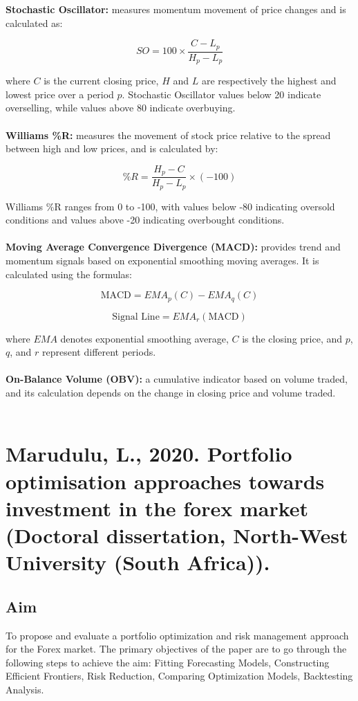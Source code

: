 \documentclass{article}
\begin{document}
    \textbf{Stochastic Oscillator:} measures momentum movement of price changes and is calculated as:
    
    \[
    SO = 100 \times \frac{C - L_p}{H_p - L_p}
    \]
    
    where \(C\) is the current closing price, \(H\) and \(L\) are respectively the highest and lowest price over a period \(p\). Stochastic Oscillator values below 20 indicate overselling, while values above 80 indicate overbuying.\\\\
    
    \textbf{Williams \%R:}
    measures the movement of stock price relative to the spread between high and low prices, and is calculated by:
    
    \[
    \%R = \frac{H_p - C}{H_p - L_p} \times (-100)
    \]
    
    Williams \%R ranges from 0 to -100, with values below -80 indicating oversold conditions and values above -20 indicating overbought conditions.\\\\
    
    \textbf{Moving Average Convergence Divergence (MACD):}
    provides trend and momentum signals based on exponential smoothing moving averages. It is calculated using the formulas:
    
    \[
    \text{MACD} = EMA_p(C) - EMA_q(C)
    \]
    
    \[
    \text{Signal Line} = EMA_r(\text{MACD})
    \]
    
    where \(EMA\) denotes exponential smoothing average, \(C\) is the closing price, and \(p\), \(q\), and \(r\) represent different periods.\\\\
    
    \textbf{On-Balance Volume (OBV):} a cumulative indicator based on volume traded, and its calculation depends on the change in closing price and volume traded.\\\\

    
\section{Marudulu, L., 2020. Portfolio optimisation approaches towards investment in the forex market (Doctoral dissertation, North-West University (South Africa)).}
    \subsection*{Aim}
    To propose and evaluate a portfolio optimization and risk management approach for the Forex market. The primary objectives of the paper are to go through the following steps to achieve the aim: Fitting Forecasting Models, Constructing Efficient Frontiers, Risk Reduction, Comparing Optimization Models, Backtesting Analysis.
    \\\\
    
\end{document}
